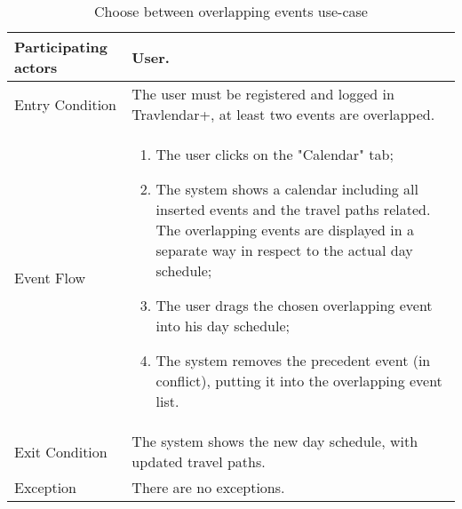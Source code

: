 \begin{table}[H]
	\begin{center}
		\begin{tabular}{ | p{} | p{} | }
		\hline
		Participating actors & User.\\
		\hline
		Entry Condition & The user must be registered and logged in Travlendar+, at least two events are overlapped.\\
		\hline
		Event Flow & 
			\begin{enumerate}
				\item The user clicks on the "Calendar" tab;
				\item The system shows a calendar including all inserted events and the travel paths related. The overlapping events are displayed in a separate way in respect to the actual day schedule;
				\item The user drags the chosen overlapping event into his day schedule;
				\item The system removes the precedent event (in conflict), putting it into the overlapping event list.
			\end{enumerate} \\
		\hline
		Exit Condition & The system shows the new day schedule, with updated travel paths. \\
		\hline
		Exception & There are no exceptions.\\ 
		\hline
		\end{tabular}
	\end{center}
	\caption{Choose between overlapping events use-case}
\end{table}